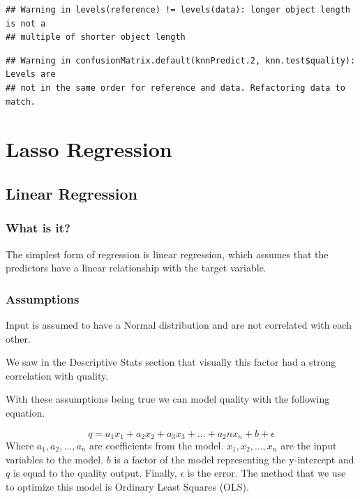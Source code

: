 \documentclass[
]{book}
\begin{document}
\begin{verbatim}
## Warning in levels(reference) != levels(data): longer object length is not a
## multiple of shorter object length
\end{verbatim}

\begin{verbatim}
## Warning in confusionMatrix.default(knnPredict.2, knn.test$quality): Levels are
## not in the same order for reference and data. Refactoring data to match.
\end{verbatim}

\hypertarget{lasso-regression}{%
\chapter{Lasso Regression}\label{lasso-regression}}

\hypertarget{linear-regression}{%
\section{Linear Regression}\label{linear-regression}}

\hypertarget{what-is-it}{%
\subsection{What is it?}\label{what-is-it}}

The simplest form of regression is linear regression, which assumes that the predictors have a linear relationship with the target variable. \citet{regression_r}\\

\hypertarget{assumptions}{%
\subsection{Assumptions}\label{assumptions}}

Input is assumed to have a Normal distribution and are not correlated with each other.

We saw in the Descriptive Stats section that visually this factor had a strong correlation with quality.

With these assumptions being true we can model quality with the following equation. \citet{elastic_net}

\[ q = a_1x_1 + a_2x_2 + a_3x_3 + \dots + a_2nx_n + b + \epsilon\]
Where \(a_1, a_2, \dots, a_n\) are coefficients from the model. \(x_1, x_2, \dots, x_n\) are the input variables to the model. \(b\) is a factor of the model representing the y-intercept and \(q\) is equal to the quality output. Finally, \(\epsilon\) is the error.
The method that we use to optimize this model is Ordinary Least Squares (OLS).
\end{document}
